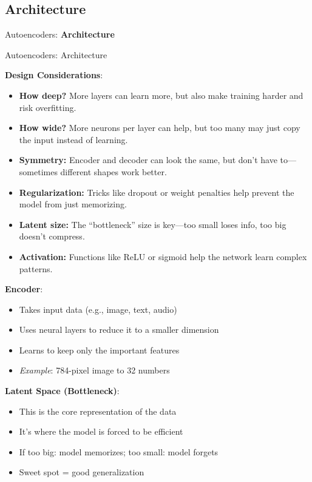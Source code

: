 \subsection{Architecture}
\begin{frame}{}
    \LARGE Autoencoders: \textbf{Architecture}
\end{frame}

\begin{frame}[allowframebreaks]{Autoencoders: Architecture}


\textbf{Design Considerations}:
\small
\begin{itemize}
    \item \textbf{How deep?} More layers can learn more, but also make training harder and risk overfitting.
    \item \textbf{How wide?} More neurons per layer can help, but too many may just copy the input instead of learning.
    \item \textbf{Symmetry:} Encoder and decoder can look the same, but don’t have to—sometimes different shapes work better.
    \item \textbf{Regularization:} Tricks like dropout or weight penalties help prevent the model from just memorizing.
    \item \textbf{Latent size:} The “bottleneck” size is key—too small loses info, too big doesn’t compress.
    \item \textbf{Activation:} Functions like ReLU or sigmoid help the network learn complex patterns.
\end{itemize}
\normalsize

\framebreak

\textbf{Encoder}:
\begin{itemize}
    \item Takes input data (e.g., image, text, audio)
    \item Uses neural layers to reduce it to a smaller dimension
    \item Learns to keep only the important features
    \item \textit{Example}: 784-pixel image to 32 numbers
\end{itemize}

\framebreak
\textbf{Latent Space (Bottleneck)}:
\begin{itemize}
    \item This is the core representation of the data
    \item It's where the model is forced to be efficient
    \item If too big: model memorizes; too small: model forgets
    \item Sweet spot = good generalization
\end{itemize}


\end{frame}
